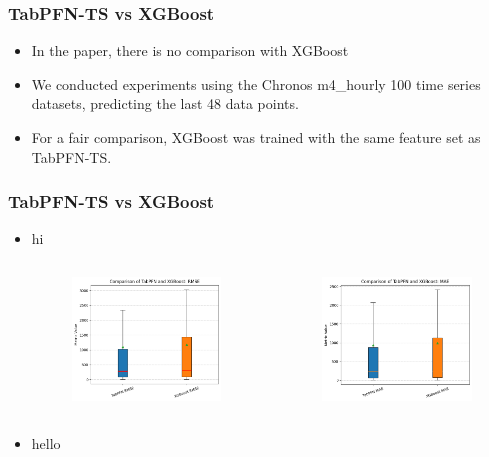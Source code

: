\documentclass[compress]{beamer}
\begin{document}
\begin{frame}\frametitle{TabPFN-TS vs XGBoost}
	\begin{itemize}
		\item In the paper, there is no comparison with XGBoost
		\item We conducted experiments using the Chronos \cite{ansari2024chronos} m4\_hourly 100 time series datasets, predicting the last 48 data points.
		\item For a fair comparison, XGBoost was trained with the same feature set as TabPFN-TS.
	\end{itemize}
\end{frame}

\begin{frame}\frametitle{TabPFN-TS vs XGBoost}
	\begin{itemize}
        \item hi
		\begin{columns}
			\begin{column}{5cm}
				\begin{figure}
					\includegraphics[width = 5cm]{images/fig_ts_rmse.png}
				\end{figure}
			\end{column}
			\begin{column}{5cm}
				\begin{figure}
					\includegraphics[width = 5cm]{images/fig_ts_mae.png}
				\end{figure}
			\end{column}			
		\end{columns}
        \item hello
	\end{itemize}
\end{frame}
\end{document}
